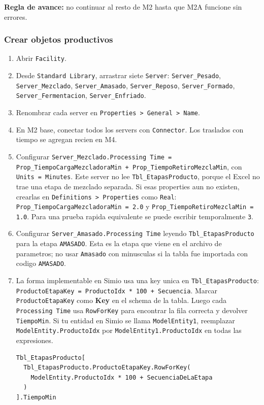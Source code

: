 \documentclass[11pt]{article}
\newcommand{\simio}[1]{\texttt{#1}}
\newcommand{\tabla}[1]{\texttt{#1}}
\newcommand{\state}[1]{\texttt{#1}}
\begin{document}
\textbf{Regla de avance:} no continuar al resto de M2 hasta que M2A funcione sin errores.

\subsubsection{Crear objetos productivos}
\begin{enumerate}
  \item Abrir \simio{Facility}.
  \item Desde \simio{Standard Library}, arrastrar siete \simio{Server}: \simio{Server\_Pesado}, \simio{Server\_Mezclado}, \simio{Server\_Amasado}, \simio{Server\_Reposo}, \simio{Server\_Formado}, \simio{Server\_Fermentacion}, \simio{Server\_Enfriado}.
  \item Renombrar cada server en \simio{Properties > General > Name}.
  \item En M2 base, conectar todos los servers con \simio{Connector}. Los traslados con tiempo se agregan recien en M4.
  \item Configurar \simio{Server\_Mezclado.Processing Time = Prop\_TiempoCargaMezcladoraMin + Prop\_TiempoRetiroMezclaMin}, con \simio{Units = Minutes}. Este server no lee \tabla{Tbl\_EtapasProducto}, porque el Excel no trae una etapa de mezclado separada. Si esas properties aun no existen, crearlas en \simio{Definitions > Properties} como \simio{Real}: \state{Prop\_TiempoCargaMezcladoraMin = 2.0} y \state{Prop\_TiempoRetiroMezclaMin = 1.0}. Para una prueba rapida equivalente se puede escribir temporalmente \simio{3}.
  \item Configurar \simio{Server\_Amasado.Processing Time} leyendo \tabla{Tbl\_EtapasProducto} para la etapa \state{AMASADO}. Esta es la etapa que viene en el archivo de parametros; no usar \simio{Amasado} con minusculas si la tabla fue importada con codigo \simio{AMASADO}.
  \item La forma implementable en Simio usa una key unica en \tabla{Tbl\_EtapasProducto}: \state{ProductoEtapaKey = ProductoIdx * 100 + Secuencia}. Marcar \state{ProductoEtapaKey} como \textbf{Key} en el schema de la tabla. Luego cada \simio{Processing Time} usa \simio{RowForKey} para encontrar la fila correcta y devolver \state{TiempoMin}. Si tu entidad en Simio se llama \simio{ModelEntity1}, reemplazar \state{ModelEntity.ProductoIdx} por \state{ModelEntity1.ProductoIdx} en todas las expresiones.

  \begin{lstlisting}[language={},basicstyle=\ttfamily\small]
Tbl_EtapasProducto[
  Tbl_EtapasProducto.ProductoEtapaKey.RowForKey(
    ModelEntity.ProductoIdx * 100 + SecuenciaDeLaEtapa
  )
].TiempoMin
  \end{lstlisting}


\end{enumerate}
\end{document}

